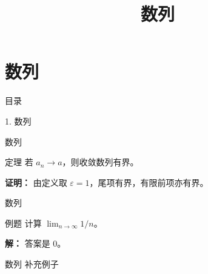 \documentclass[aspectratio=169,10pt,fontset=fandol]{ctexbeamer}
\title{数列}
\begin{document}
\section{数列}
\begin{frame}[t,fragile]{目录}
\normalsize
{\color{blue}\normalsize 1. 数列\par}\vspace{0.3em}
\end{frame}
\begin{frame}[t,fragile]{数列}
\normalsize
\begin{block}{定理}
{\normalsize
若 $a_n\to a$，则收敛数列有界。
}
\end{block}
\pause
{\normalsize
\textbf{证明：}
由定义取 $\varepsilon=1$，尾项有界，有限前项亦有界。
}
\end{frame}
\begin{frame}[t,fragile]{数列}
\normalsize
\begin{block}{例题}
{\normalsize
计算 $\lim_{n\to\infty}1/n$。
}
\end{block}
\pause
{\normalsize
\textbf{解：}
答案是 $0$。
}
\end{frame}
\begin{frame}[t,fragile]{数列}
\normalsize
\normalsize 补充例子
\end{frame}
\end{document}
